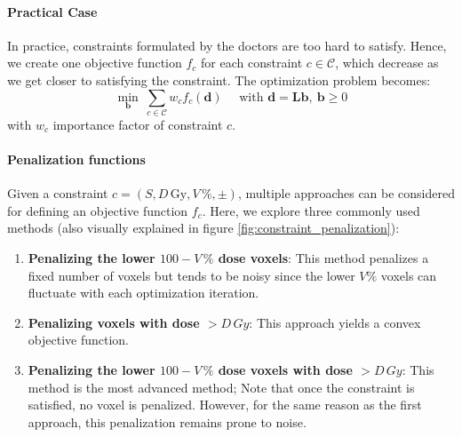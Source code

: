 \paragraph{Practical Case}
In practice, constraints formulated by the doctors are too hard to satisfy.
Hence, we create one objective function $f_c$ for each constraint $c \in \mathcal{C}$, which decrease as we get closer to satisfying the constraint.
The optimization problem becomes:
$$
\min_{\mathbf{b}} \ \sum_{c \in \mathcal{C}} w_c f_c(\mathbf{d})
\quad \text{ with }
\mathbf{d} = \textbf{L}\mathbf{b}, \ \mathbf{b} \geq 0
$$
with $w_c$ importance factor of constraint $c$.

\paragraph{Penalization functions}
Given a constraint $c = \left( S, D\,\text{Gy}, V\,\%, \pm \right)$, multiple approaches can be considered for defining an objective function \( f_c \).
Here, we explore three commonly used methods (also visually explained in figure \ref{fig:constraint_penalization}):

\begin{enumerate}
	\item \textbf{Penalizing the lower $100-V\,\%$ dose voxels}:
	This method penalizes a fixed number of voxels but tends to be noisy since the lower $V\%$ voxels can fluctuate with each optimization iteration.
	\item \textbf{Penalizing voxels with dose $>D\, Gy$}:
	This approach yields a convex objective function.
	\item \textbf{Penalizing the lower $100-V\,\%$ dose voxels with dose $>D\, Gy$}:
	This method is the most advanced method; 
	Note that once the constraint is satisfied, no voxel is penalized.
	However, for the same reason as the first approach, this penalization remains prone to noise.
\end{enumerate}

